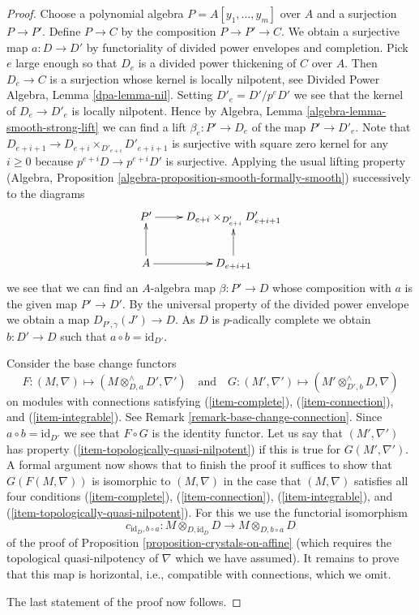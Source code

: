 \begin{proof}
Choose a polynomial algebra $P = A[y_1, \ldots, y_m]$ over $A$ and a
surjection $P \to P'$. Define $P \to C$ by the composition $P \to P' \to C$.
We obtain a surjective map $a : D \to D'$ by functoriality of
divided power envelopes and completion. Pick $e$ large enough so that
$D_e$ is a divided power
thickening of $C$ over $A$. Then $D_e \to C$ is a surjection whose kernel
is locally nilpotent, see Divided Power Algebra, Lemma \ref{dpa-lemma-nil}.
Setting $D'_e = D'/p^eD'$
we see that the kernel of $D_e \to D'_e$ is locally nilpotent.
Hence by Algebra, Lemma \ref{algebra-lemma-smooth-strong-lift}
we can find a lift $\beta_e : P' \to D_e$ of the map $P' \to D'_e$.
Note that $D_{e + i + 1} \to D_{e + i} \times_{D'_{e + i}} D'_{e + i + 1}$
is surjective with square zero kernel for any $i \geq 0$ because
$p^{e + i}D \to p^{e + i}D'$ is surjective. Applying the usual lifting
property (Algebra, Proposition \ref{algebra-proposition-smooth-formally-smooth})
successively to the diagrams
$$
\xymatrix{
P' \ar[r] & D_{e + i} \times_{D'_{e + i}} D'_{e + i + 1} \\
A \ar[u] \ar[r] & D_{e + i + 1} \ar[u]
}
$$
we see that we can find an $A$-algebra map $\beta : P' \to D$ whose
composition with $a$ is the given map $P' \to D'$.
By the universal property of the divided power envelope we obtain a
map $D_{P', \gamma}(J') \to D$. As $D$ is $p$-adically complete we
obtain $b : D' \to D$ such that $a \circ b = \text{id}_{D'}$.

\medskip\noindent
Consider the base change functors
$$
F : (M, \nabla) \longmapsto
(M \otimes^\wedge_{D, a} D', \nabla')
\quad\text{and}\quad
G : (M', \nabla') \longmapsto
(M' \otimes^\wedge_{D', b} D, \nabla)
$$
on modules with connections satisfying (\ref{item-complete}),
(\ref{item-connection}), and (\ref{item-integrable}).
See Remark \ref{remark-base-change-connection}.
Since $a \circ b = \text{id}_{D'}$ we see that
$F \circ G$ is the identity functor. Let us say that $(M', \nabla')$
has property (\ref{item-topologically-quasi-nilpotent}) if this
is true for $G(M', \nabla')$. A formal argument now shows that to finish
the proof it suffices to show that $G(F(M, \nabla))$ is isomorphic
to $(M, \nabla)$ in the case that $(M, \nabla)$ satisfies all four
conditions (\ref{item-complete}), (\ref{item-connection}),
(\ref{item-integrable}), and (\ref{item-topologically-quasi-nilpotent}).
For this we use the functorial isomorphism
$$
c_{\text{id}_D, b \circ a} :
M \otimes_{D, \text{id}_D} D
\longrightarrow
M \otimes_{D, b \circ a} D
$$
of the proof of Proposition \ref{proposition-crystals-on-affine}
(which requires the topological quasi-nilpotency of $\nabla$
which we have assumed).
It remains to prove that this map is horizontal, i.e.,
compatible with connections, which we omit.

\medskip\noindent
The last statement of the proof now follows.
\end{proof}

